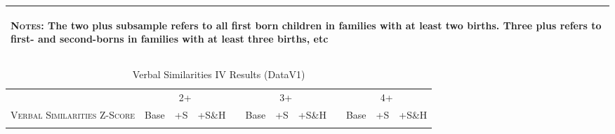 \begin{landscape}
\begin{table}[htpb!]
\begin{center}
\begin{tabular}{lcccp{2mm}cccp{2mm}ccc}
\midrule\multicolumn{12}{p{19.2cm}}{\begin{footnotesize}\textsc{Notes:} The two plus subsample refers to all first born children in families with at least two births.  Three plus refers to first- and second-borns in families with at least three births, etc\end{footnotesize}} \\ \bottomrule 
\end{tabular}\end{center}\end{table}\end{landscape}\begin{landscape}\begin{table}[htpb!]\caption{Verbal Similarities IV Results (DataV1)}
\label{TWINtab:IVAll}
\begin{center}\begin{tabular}{lcccp{2mm}cccp{2mm}ccc}
\toprule \toprule 
&\multicolumn{3}{c}{2+}&&\multicolumn{3}{c}{3+}&&\multicolumn{3}{c}{4+}\\ \cmidrule(r){2-4} \cmidrule(r){6-8} \cmidrule(r){10-12} 
\textsc{Verbal Similarities Z-Score}&Base&+S&+S\&H&&Base&+S&+S\&H&&Base&+S&+S\&H\\ \midrule 
\begin{footnotesize}\end{footnotesize}& 
\begin{footnotesize}\end{footnotesize}& 
\begin{footnotesize}\end{footnotesize}& 
\begin{footnotesize}\end{footnotesize}& 
\begin{footnotesize}\end{footnotesize}& 
\begin{footnotesize}\end{footnotesize}& 
\begin{footnotesize}\end{footnotesize}& 
\begin{footnotesize}\end{footnotesize}& 
\begin{footnotesize}\end{footnotesize}& 
\begin{footnotesize}\end{footnotesize}& 
\begin{footnotesize}\end{footnotesize}& 

\end{tabular}
\end{center}
\end{table}
\end{landscape}
